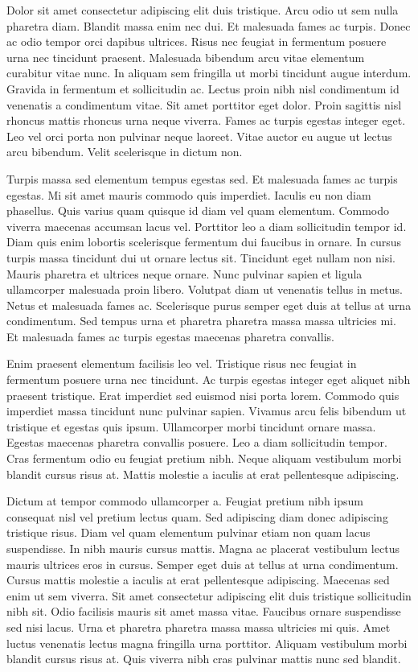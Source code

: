 \documentclass[11pt,a4paper]{article}
\begin{document}
Dolor sit amet consectetur adipiscing elit duis tristique. Arcu odio ut sem nulla pharetra diam. Blandit massa enim nec dui. Et malesuada fames ac turpis. Donec ac odio tempor orci dapibus ultrices. Risus nec feugiat in fermentum posuere urna nec tincidunt praesent. Malesuada bibendum arcu vitae elementum curabitur vitae nunc. In aliquam sem fringilla ut morbi tincidunt augue interdum. Gravida in fermentum et sollicitudin ac. Lectus proin nibh nisl condimentum id venenatis a condimentum vitae. Sit amet porttitor eget dolor. Proin sagittis nisl rhoncus mattis rhoncus urna neque viverra. Fames ac turpis egestas integer eget. Leo vel orci porta non pulvinar neque laoreet. Vitae auctor eu augue ut lectus arcu bibendum. Velit scelerisque in dictum non.

Turpis massa sed elementum tempus egestas sed. Et malesuada fames ac turpis egestas. Mi sit amet mauris commodo quis imperdiet. Iaculis eu non diam phasellus. Quis varius quam quisque id diam vel quam elementum. Commodo viverra maecenas accumsan lacus vel. Porttitor leo a diam sollicitudin tempor id. Diam quis enim lobortis scelerisque fermentum dui faucibus in ornare. In cursus turpis massa tincidunt dui ut ornare lectus sit. Tincidunt eget nullam non nisi. Mauris pharetra et ultrices neque ornare. Nunc pulvinar sapien et ligula ullamcorper malesuada proin libero. Volutpat diam ut venenatis tellus in metus. Netus et malesuada fames ac. Scelerisque purus semper eget duis at tellus at urna condimentum. Sed tempus urna et pharetra pharetra massa massa ultricies mi. Et malesuada fames ac turpis egestas maecenas pharetra convallis.

Enim praesent elementum facilisis leo vel. Tristique risus nec feugiat in fermentum posuere urna nec tincidunt. Ac turpis egestas integer eget aliquet nibh praesent tristique. Erat imperdiet sed euismod nisi porta lorem. Commodo quis imperdiet massa tincidunt nunc pulvinar sapien. Vivamus arcu felis bibendum ut tristique et egestas quis ipsum. Ullamcorper morbi tincidunt ornare massa. Egestas maecenas pharetra convallis posuere. Leo a diam sollicitudin tempor. Cras fermentum odio eu feugiat pretium nibh. Neque aliquam vestibulum morbi blandit cursus risus at. Mattis molestie a iaculis at erat pellentesque adipiscing.

Dictum at tempor commodo ullamcorper a. Feugiat pretium nibh ipsum consequat nisl vel pretium lectus quam. Sed adipiscing diam donec adipiscing tristique risus. Diam vel quam elementum pulvinar etiam non quam lacus suspendisse. In nibh mauris cursus mattis. Magna ac placerat vestibulum lectus mauris ultrices eros in cursus. Semper eget duis at tellus at urna condimentum. Cursus mattis molestie a iaculis at erat pellentesque adipiscing. Maecenas sed enim ut sem viverra. Sit amet consectetur adipiscing elit duis tristique sollicitudin nibh sit. Odio facilisis mauris sit amet massa vitae. Faucibus ornare suspendisse sed nisi lacus. Urna et pharetra pharetra massa massa ultricies mi quis. Amet luctus venenatis lectus magna fringilla urna porttitor. Aliquam vestibulum morbi blandit cursus risus at. Quis viverra nibh cras pulvinar mattis nunc sed blandit.
\end{document}
